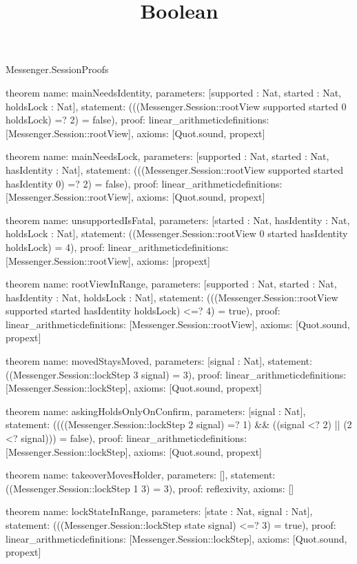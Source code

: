 \begin{lexlean}{Messenger.SessionProofs}
\title{Boolean}
\begin{semanticmodule}
theorem{
  name: mainNeedsIdentity,
  parameters: [supported : Nat, started : Nat, holdsLock : Nat],
  statement: (((Messenger.Session::rootView supported started 0 holdsLock) =? 2) = false),
  proof: linear_arithmetic{definitions: [Messenger.Session::rootView]},
  axioms: [Quot.sound, propext]
}

theorem{
  name: mainNeedsLock,
  parameters: [supported : Nat, started : Nat, hasIdentity : Nat],
  statement: (((Messenger.Session::rootView supported started hasIdentity 0) =? 2) = false),
  proof: linear_arithmetic{definitions: [Messenger.Session::rootView]},
  axioms: [Quot.sound, propext]
}

theorem{
  name: unsupportedIsFatal,
  parameters: [started : Nat, hasIdentity : Nat, holdsLock : Nat],
  statement: ((Messenger.Session::rootView 0 started hasIdentity holdsLock) = 4),
  proof: linear_arithmetic{definitions: [Messenger.Session::rootView]},
  axioms: [propext]
}

theorem{
  name: rootViewInRange,
  parameters: [supported : Nat, started : Nat, hasIdentity : Nat, holdsLock : Nat],
  statement: (((Messenger.Session::rootView supported started hasIdentity holdsLock) <=? 4) = true),
  proof: linear_arithmetic{definitions: [Messenger.Session::rootView]},
  axioms: [Quot.sound, propext]
}

theorem{
  name: movedStaysMoved,
  parameters: [signal : Nat],
  statement: ((Messenger.Session::lockStep 3 signal) = 3),
  proof: linear_arithmetic{definitions: [Messenger.Session::lockStep]},
  axioms: [Quot.sound, propext]
}

theorem{
  name: askingHoldsOnlyOnConfirm,
  parameters: [signal : Nat],
  statement: ((((Messenger.Session::lockStep 2 signal) =? 1) && ((signal <? 2) || (2 <? signal))) = false),
  proof: linear_arithmetic{definitions: [Messenger.Session::lockStep]},
  axioms: [Quot.sound, propext]
}

theorem{
  name: takeoverMovesHolder,
  parameters: [],
  statement: ((Messenger.Session::lockStep 1 3) = 3),
  proof: reflexivity{},
  axioms: []
}

theorem{
  name: lockStateInRange,
  parameters: [state : Nat, signal : Nat],
  statement: (((Messenger.Session::lockStep state signal) <=? 3) = true),
  proof: linear_arithmetic{definitions: [Messenger.Session::lockStep]},
  axioms: [Quot.sound, propext]
}


\end{semanticmodule}
\end{lexlean}
